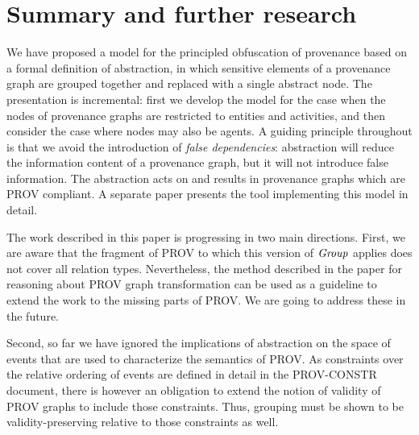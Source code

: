 
\section{Summary and further research}
\label{sec:further}

We have proposed a model for the principled obfuscation of provenance based on a formal definition of abstraction, in which sensitive elements of a provenance graph are grouped together and replaced with a single abstract node.  The presentation is incremental: first we develop the model for the case when the nodes of provenance graphs are restricted to entities and activities, and then consider the case where nodes may also be agents.  A guiding principle  throughout is that we avoid the introduction of \emph{false dependencies}: abstraction will reduce the information content of a provenance graph, but it will not introduce false information.  
The abstraction acts on and results in provenance graphs which are PROV compliant.   A separate paper presents the tool implementing this model in detail.


The work described in this paper is progressing in two main directions.
%
First, we are aware that the fragment of PROV to which this version of $\mathit{Group}$ applies does not cover all relation types. Nevertheless, the method described in the paper for reasoning about PROV graph transformation can be used as a guideline to extend the work to the missing parts of PROV. We are going to address these in the future.

Second, so far we have ignored the implications of abstraction on the space of events that are used to characterize the semantics of PROV. As constraints over the relative ordering of events are defined in detail in the PROV-CONSTR document, there is however an obligation to extend the notion of validity of PROV graphs to include those constraints. Thus, grouping must be shown to be validity-preserving relative to those constraints as well. 

